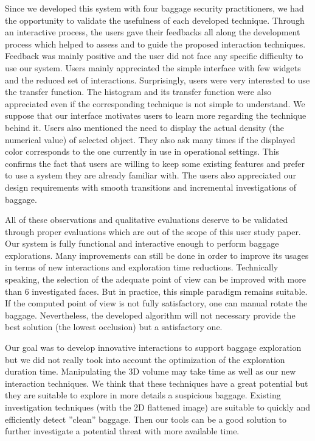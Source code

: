 Since we developed this system with four baggage security practitioners, we had the opportunity to validate the usefulness of each developed technique. Through an interactive process, the users gave their feedbacks all along the development process which helped to assess and to guide the proposed interaction techniques. Feedback was mainly positive and the user did not face any specific difficulty to use our system. Users mainly appreciated the simple interface with few widgets and the reduced set of interactions. Surprisingly, users were very interested to use the transfer function. The histogram and its transfer function were also appreciated even if the corresponding technique is not simple to understand. We suppose that our interface motivates users to learn more regarding the technique behind it. Users also mentioned the need to display the actual density (the numerical value) of selected object. They also ask many times if the displayed color corresponds to the one currently in use in operational settings. This confirms the fact that users are willing to keep some existing features and prefer to use a system they are already familiar with.
The users also appreciated our design requirements with smooth transitions and incremental investigations of baggage.
\par All of these observations and qualitative evaluations deserve to be validated through proper evaluations which are out of the scope of this user study paper.
Our system is fully functional and interactive enough to perform baggage explorations. Many improvements can still be done in order to improve its usages in terms of new interactions and exploration time reductions.
Technically speaking, the selection of the adequate point of view can be improved with more than 6 investigated faces. But in practice, this simple paradigm remains suitable. If the computed point of view is not fully satisfactory, one can manual rotate the baggage. Nevertheless, the developed algorithm will not necessary provide the best solution (the lowest occlusion) but a satisfactory one.
\par Our goal was to develop
innovative interactions to support baggage exploration but we did not really took into account the optimization of the exploration duration time. Manipulating the 3D volume may take time as well as our new interaction techniques. We think that these techniques have a great potential but they are suitable to explore in more details a suspicious baggage. Existing investigation techniques (with the 2D flattened image) are suitable to quickly and efficiently detect ''clean'' baggage. Then our tools can be a good solution to further investigate a potential threat with more available time.